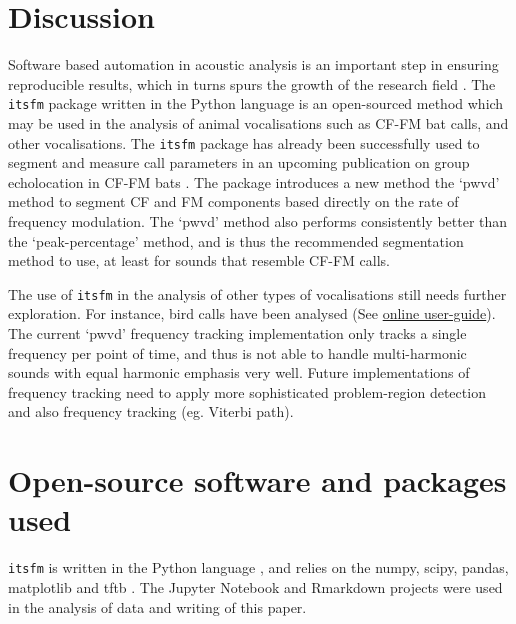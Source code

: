 \documentclass[
]{book}
\begin{document}
\hypertarget{discussion-2}{%
\section{Discussion}\label{discussion-2}}

Software based automation in acoustic analysis is an important step in ensuring reproducible results, which in turns spurs the growth of the research field \citep{mcfee2018open, bakervincent2019}. The \texttt{itsfm} package written in the Python \citep{van1995python} language is an open-sourced method which may be used in the analysis of animal vocalisations such as CF-FM bat calls, and other vocalisations. The \texttt{itsfm} package has already been successfully used to segment and measure call parameters in an upcoming publication on group echolocation in CF-FM bats \citep{hbcpaper}. The package introduces a new method the `pwvd' method to segment CF and FM components based directly on the rate of frequency modulation. The `pwvd' method also performs consistently better than the `peak-percentage' method, and is thus the recommended segmentation method to use, at least for sounds that resemble CF-FM calls.

The use of \texttt{itsfm} in the analysis of other types of vocalisations still needs further exploration. For instance, bird calls have been analysed (See \href{https://itsfm.readthedocs.io/en/latest/gallery_dir/z_bird_eg.html\#sphx-glr-gallery-dir-z-bird-eg-py}{online user-guide}). The current `pwvd' frequency tracking implementation only tracks a single frequency per point of time, and thus is not able to handle multi-harmonic sounds with equal harmonic emphasis very well. Future implementations of frequency tracking need to apply more sophisticated problem-region detection and also frequency tracking (eg. Viterbi path).

\hypertarget{open-source-software-and-packages-used}{%
\section{Open-source software and packages used}\label{open-source-software-and-packages-used}}

\texttt{itsfm} is written in the Python language \citep{van1995python}, and relies on the numpy, scipy, pandas, matplotlib and tftb \citep{numpy, 2020SciPy, hunter2007a, pandas, tftb}. The Jupyter Notebook and Rmarkdown projects \citep{jupyter, rmarkdown} were used in the analysis of data and writing of this paper.
\end{document}
